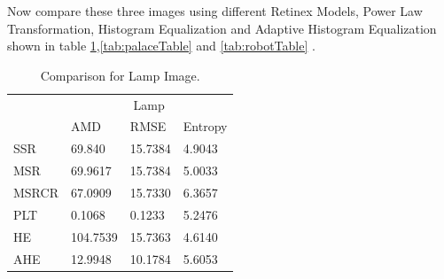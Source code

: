 Now compare these three images using different Retinex Models, Power Law Transformation, Histogram Equalization and Adaptive Histogram Equalization shown in table \ref{tab:lampTable},\ref{tab:palaceTable} and \ref{tab:robotTable} .

\begin{table}
	\caption{Comparison for Lamp Image.}
    \label{tab:lampTable}
    \center
    \begin{tabular}{ |p{2cm}||p{2cm}|p{2cm}|p{2cm}|  }

 		\hline
 		\multirow{2}{*}{\rotatebox[origin=c]{0}{Technique}}&\multicolumn{3}{|c|}{Lamp} \\
 		\cline{2-4}
  			&AMD&RMSE&Entropy    \\
 		\hline
 			SSR& 69.840  &15.7384 &4.9043 \\
 		\hline
 			MSR &69.9617 &15.7384 &5.0033  \\
 		\hline
 			MSRCR& 67.0909  &15.7330 &6.3657 \\
 		\hline
 			PLT& 0.1068  &0.1233 &5.2476\\
 		\hline
 			HE& 104.7539  &15.7363 &4.6140 \\
 		\hline
 			AHE& 12.9948  & 10.1784& 5.6053 \\
 		\hline
	\end{tabular}
\end{table}

    




